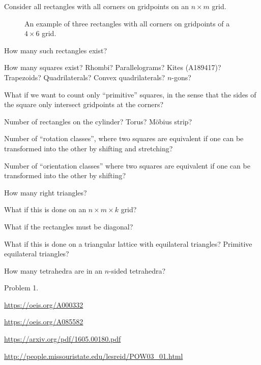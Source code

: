 \documentclass{article}
\begin{document}
Consider all rectangles with all corners on gridpoints on an $n \times m$ grid.
\begin{figure}[!h]
  \centering
  \caption{
    An example of three rectangles with all corners on gridpoints of a
    $4 \times 6$ grid.
  }
\end{figure}

\begin{question}
  How many such rectangles exist?
\end{question}
\begin{related}
  \item How many squares exist? Rhombi? Parallelograms? Kites (A189417)?
    Trapezoids? Quadrilaterals? Convex quadrilaterals? $n$-gons?
  \item What if we want to count only ``primitive'' squares, in the sense that
    the sides of the square only intersect gridpoints at the corners?
  \item Number of rectangles on the cylinder? Torus? M\"obius strip?
  \item Number of ``rotation classes'', where two squares are equivalent if
    one can be transformed into the other by shifting and stretching?
  \item Number of ``orientation classes'' where two squares are equivalent if
    one can be transformed into the other by shifting?
  \item How many right triangles?
  \item What if this is done on an $n \times m \times k$ grid?
  \item What if the rectangles must be diagonal?
  \item What if this is done on a triangular lattice with equilateral triangles?
    Primitive equilateral triangles?
  \item How many tetrahedra are in an $n$-sided tetrahedra?
\end{related}
\begin{references}
  \item Problem 1.
  \item \url{https://oeis.org/A000332}
  \item \url{https://oeis.org/A085582}
  \item \url{https://arxiv.org/pdf/1605.00180.pdf}
  \item \url{http://people.missouristate.edu/lesreid/POW03_01.html}
\end{references}
\end{document}
